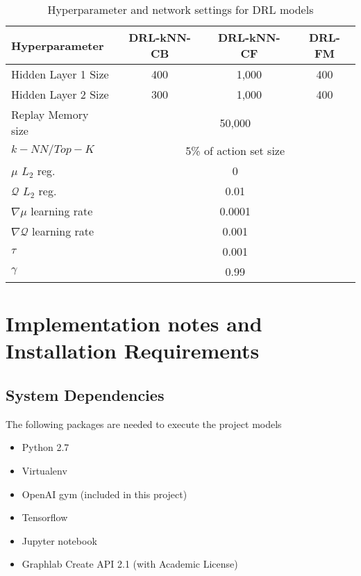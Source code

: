 \begin{table}[!htbp]
\centering
\begin{tabular}{ |l|c|c|c| }
  \hline
  \textbf{Hyperparameter}& \textbf{DRL-kNN-CB} & \textbf{DRL-kNN-CF} & \textbf{DRL-FM} \\
  \hline
  Hidden Layer 1 Size & 400 & 1,000 & 400 \\ \hline
  Hidden Layer 2 Size & 300 & 1,000 & 400 \\ \hline
  Replay Memory size & \multicolumn{3}{c|}{50,000} \\ \hline
  $k-NN/Top-K$ & \multicolumn{3}{c|}{5\% of action set size} \\ \hline
  $\mu$ $L_2$ reg. & \multicolumn{3}{c|}{0} \\ \hline
  $\mathcal{Q}$ $L_2$ reg. & \multicolumn{3}{c|}{0.01} \\ \hline
  $\nabla \mu$ learning rate & \multicolumn{3}{c|}{0.0001} \\ \hline
  $\nabla \mathcal{Q}$ learning rate & \multicolumn{3}{c|}{0.001} \\ \hline
  $\tau$ & \multicolumn{3}{c|}{0.001} \\
  $\gamma$ & \multicolumn{3}{c|}{0.99} \\
  \hline
\end{tabular}
\caption{Hyperparameter and network settings for DRL models}
\label{table:hyperparameters}
\end{table}

\chapter{Implementation notes and Installation Requirements}
\label{app:implementation}

\section{System Dependencies}

The following packages are needed to execute the project models

\begin{itemize}
\item Python 2.7
\item Virtualenv
\item OpenAI gym (included in this project)
\item Tensorflow
\item Jupyter notebook
\item Graphlab Create API 2.1 (with Academic License)
\end{itemize}

